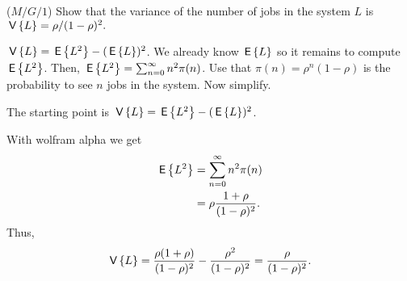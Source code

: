 \begin{exercise}($M/G/1$)
Show that the variance of the number of jobs in the system $L$ is
$\,\mathsf{V}\left\{L\right\} = \rho/(1-\rho)^2.$
  \begin{hint}
    $\,\mathsf{V}\left\{L\right\} = \,\mathsf{E}\left\{L^2\right\} - (\,\mathsf{E}\left\{L\right\})^2$. We already know $\,\mathsf{E}\left\{L\right\}$ so it remains
    to compute $\,\mathsf{E}\left\{L^2\right\}$. Then, $\,\mathsf{E}\left\{L^2 \right\}= \sum_{n=0}^\infty n^2 \pi(n)$. Use that $\pi(n)=\rho^n(1-\rho)$ is the probability to see $n$ jobs in the system. Now simplify.    
  \end{hint}
  \begin{solution}
The starting point is  $\,\mathsf{V}\left\{L\right\} = \,\mathsf{E}\left\{L^2\right\} - (\,\mathsf{E}\left\{L\right\})^2$. 

With wolfram alpha we get
    \begin{equation*}
      \begin{split}
      \,\mathsf{E}\left\{L^2 \right\}
&= \sum_{n=0}^\infty n^2 \pi(n) \\
&= \rho \frac{1+\rho}{(1-\rho)^2}.
      \end{split}
    \end{equation*}
    Thus,
\begin{equation*}
\,\mathsf{V}\left\{L\right\} = \frac{\rho(1+\rho)}{(1-\rho)^2}-\frac{\rho^2}{(1-\rho)^2} = \frac{\rho}{(1-\rho)^2}.
\end{equation*}



\end{solution}
\end{exercise}
